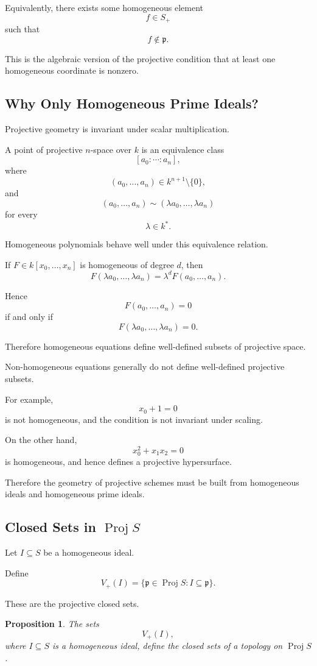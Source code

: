 \documentclass[12pt,a4paper]{article}
\DeclareMathOperator{\Proj}{Proj}
\newtheorem{proposition}[theorem]{Proposition}
\theoremstyle{notespace}
\begin{document}
Equivalently, there exists some homogeneous element
\[
f\in S_+
\]
such that
\[
f\notin \mathfrak p.
\]

This is the algebraic version of the projective condition that at least one homogeneous
coordinate is nonzero.

\subsection{Why Only Homogeneous Prime Ideals?}

Projective geometry is invariant under scalar multiplication.

A point of projective \(n\)-space over \(k\) is an equivalence class
\[
[a_0:\cdots:a_n],
\]
where
\[
(a_0,\dots,a_n)\in k^{n+1}\setminus\{0\},
\]
and
\[
(a_0,\dots,a_n)\sim(\lambda a_0,\dots,\lambda a_n)
\]
for every
\[
\lambda\in k^*.
\]

Homogeneous polynomials behave well under this equivalence relation.

If \(F\in k[x_0,\dots,x_n]\) is homogeneous of degree \(d\), then
\[
F(\lambda a_0,\dots,\lambda a_n)
=
\lambda^dF(a_0,\dots,a_n).
\]

Hence
\[
F(a_0,\dots,a_n)=0
\]
if and only if
\[
F(\lambda a_0,\dots,\lambda a_n)=0.
\]

Therefore homogeneous equations define well-defined subsets of projective space.

Non-homogeneous equations generally do not define well-defined projective subsets.

For example,
\[
x_0+1=0
\]
is not homogeneous, and the condition is not invariant under scaling.

On the other hand,
\[
x_0^2+x_1x_2=0
\]
is homogeneous, and hence defines a projective hypersurface.

Therefore the geometry of projective schemes must be built from homogeneous ideals and
homogeneous prime ideals.

\subsection{Closed Sets in \texorpdfstring{$\Proj S$}{Proj S}}

Let \(I\subseteq S\) be a homogeneous ideal.

Define
\[
V_+(I)
=
\{\mathfrak p\in \Proj S : I\subseteq \mathfrak p\}.
\]

These are the projective closed sets.

\begin{proposition}
	The sets
	\[
	V_+(I),
	\]
	where \(I\subseteq S\) is a homogeneous ideal, define the closed sets of a topology on
	\(\Proj S\).
\end{proposition}
\end{document}
